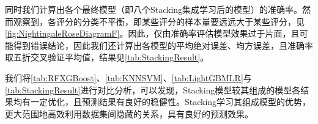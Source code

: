 \documentclass{MathorCupmodeling}
\begin{document}
	同时我们计算出各个最终模型（即八个Stacking集成学习后的模型）的准确率。然而观察到，各评分的分类不平衡，即某些评分的样本量要远远大于某些评分，见\textcolor{blue}{\cref{fig:NightingaleRoseDiagramF}}。因此，仅由准确率评估模型效果过于片面，且可能得到错误结论，因此我们还计算出各模型的平均绝对误差、均方误差，且准确率取五折交叉验证平均值，结果见\textcolor{blue}{\cref{tab:StackingResult}}。
	\begin{table}[htbp]
	\centering
	\caption{各评分预测模型效果}
	\setlength{\aboverulesep}{0pt}
	\setlength{\belowrulesep}{0pt}
	\label{tab:StackingResult}
	\end{table}
  
	我们将\textcolor{blue}{\cref{tab:RFXGBoost}}、\textcolor{blue}{\cref{tab:KNNSVM}}、\textcolor{blue}{\cref{tab:LightGBMLR}}与\textcolor{blue}{\cref{tab:StackingResult}}进行对比分析，可以发现，Stacking模型较其组成的模型各结果均有一定优化，且预测结果有良好的稳健性。Stacking学习其组成模型的优势，更大范围地高效利用数据集间隐藏的关系，具有良好的预测效果。
\end{document}
